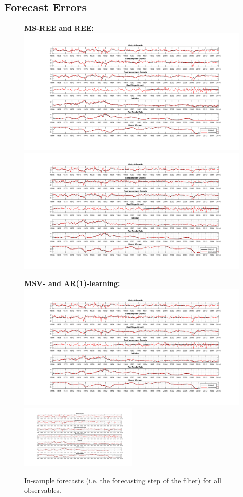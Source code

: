 \documentclass[12pt,reqno]{article}
\numberwithin{equation}{section}
\begin{document}
\subsection{Forecast Errors}
\label{sw_forecast_errors}
\begin{figure}[H]

\caption{In-sample forecasts (i.e. the forecasting step of the filter) for all observables.}
\vspace{5 mm}

\textbf{MS-REE and REE: }\\
\includegraphics[height=.5\textheight,width=.5\textwidth]{rise_forecast_errors.pdf}
\includegraphics[height=.5\textheight,width=.5\textwidth]{REE_forecast_errors.pdf}


\textbf{MSV- and AR(1)-learning: }\\
\includegraphics[height=.5\textheight,width=.5\textwidth]{sw_msv_forecast_errors.pdf}
\includegraphics[height=0.5\textheight,width=0.5\textwidth]{sw_ar1_forecast_errors.pdf}



\end{figure}
\end{document}
